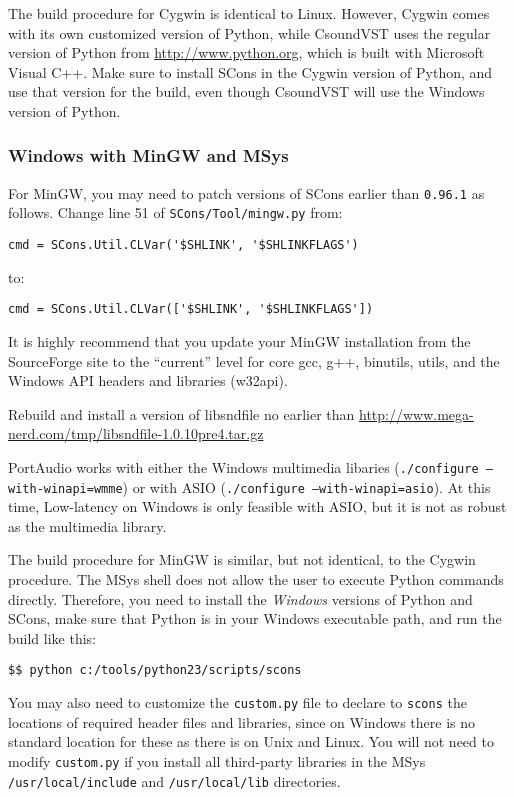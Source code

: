 \documentclass[10pt,letterpaper,onecolumn]{ltxguide}
\begin{document}
The build procedure for Cygwin is identical to Linux. However, Cygwin comes with its own customized version of Python, while CsoundVST uses the regular version of Python from \url{http://www.python.org}, which is built with Microsoft Visual C++. Make sure to install SCons in the Cygwin version of Python, and use that version for the build, even though CsoundVST will use the Windows version of Python.

\subsubsection{Windows with MinGW and MSys}

For MinGW, you may need to patch versions of SCons earlier than \texttt{0.96.1} as follows. Change line 51 of \texttt{SCons/Tool/mingw.py} from:

\begin{lstlisting}
cmd = SCons.Util.CLVar('$SHLINK', '$SHLINKFLAGS')
\end{lstlisting}
to:
\begin{lstlisting}
cmd = SCons.Util.CLVar(['$SHLINK', '$SHLINKFLAGS']) 
\end{lstlisting}

It is highly recommend that you update your MinGW installation from the SourceForge site to the ``current'' level for core gcc, g++, binutils,  utils, and the Windows API headers and libraries (w32api).

Rebuild and install a version of libsndfile no earlier than \url{http://www.mega-nerd.com/tmp/libsndfile-1.0.10pre4.tar.gz}

PortAudio works with either the Windows multimedia libaries (\texttt{./configure ---with-winapi=wmme}) or with ASIO (\texttt{./configure ---with-winapi=asio}). At this time, Low-latency on Windows is only feasible with ASIO, but it is not as robust as the multimedia library.

The build procedure for MinGW is similar, but not identical, to the Cygwin procedure. The MSys shell does not allow the user to execute Python commands directly. Therefore, you need to install the \emph{Windows} versions of Python and SCons, make sure that Python is in your Windows executable path, and run the build like this:

\begin{lstlisting}
$$ python c:/tools/python23/scripts/scons
\end{lstlisting}

You may also need to customize the \texttt{custom.py} file to declare to \texttt{scons} the locations of required header files and libraries, since on Windows there is no standard location for these as there is on Unix and Linux. You will not need to modify \texttt{custom.py} if you install all third-party libraries in the MSys \texttt{/usr/local/include} and \texttt{/usr/local/lib} directories.
\end{document}
